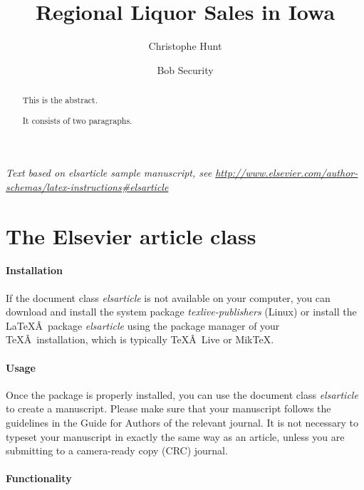 \documentclass[]{elsarticle} %
\begin{document}
\begin{frontmatter}

  \title{Regional Liquor Sales in Iowa}
    \author[CUNY School of Professional Studies]{Christophe Hunt}
  
    \author[CUNY School of Professional Studies]{Bob Security}
  
      \address[CUNY School of Professional Studies]{Data Analytics, New York, NY}
  
  \begin{abstract}
  This is the abstract.
  
  It consists of two paragraphs.
  \end{abstract}
  
 \end{frontmatter}

\emph{Text based on elsarticle sample manuscript, see
\url{http://www.elsevier.com/author-schemas/latex-instructions\#elsarticle}}

\section{The Elsevier article class}\label{the-elsevier-article-class}

\paragraph{Installation}\label{installation}

If the document class \emph{elsarticle} is not available on your
computer, you can download and install the system package
\emph{texlive-publishers} (Linux) or install the LaTeXÂ~package
\emph{elsarticle} using the package manager of your TeXÂ~installation,
which is typically TeXÂ~Live or MikTeX.

\paragraph{Usage}\label{usage}

Once the package is properly installed, you can use the document class
\emph{elsarticle} to create a manuscript. Please make sure that your
manuscript follows the guidelines in the Guide for Authors of the
relevant journal. It is not necessary to typeset your manuscript in
exactly the same way as an article, unless you are submitting to a
camera-ready copy (CRC) journal.

\paragraph{Functionality}\label{functionality}
\end{document}
